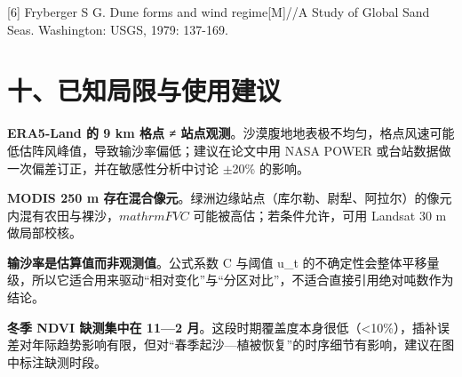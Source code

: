 \documentclass[11pt,a4paper]{ctexart}
\begin{document}
[6] Fryberger S G. Dune forms and wind regime[M]//A Study of Global Sand Seas. Washington: USGS, 1979: 137-169.


\section*{十、已知局限与使用建议}
\textbf{ERA5-Land 的 9 km 格点 ≠ 站点观测}。沙漠腹地地表极不均匀，格点风速可能低估阵风峰值，导致输沙率偏低；建议在论文中用 NASA POWER 或台站数据做一次偏差订正，并在敏感性分析中讨论 $\pm$20\% 的影响。

\textbf{MODIS 250 m 存在混合像元}。绿洲边缘站点（库尔勒、尉犁、阿拉尔）的像元内混有农田与裸沙，$mathrmFVC$ 可能被高估；若条件允许，可用 Landsat 30 m 做局部校核。

\textbf{输沙率是估算值而非观测值}。公式系数 C 与阈值 u\_t 的不确定性会整体平移量级，所以它适合用来驱动“相对变化”与“分区对比”，不适合直接引用绝对吨数作为结论。

\textbf{冬季 NDVI 缺测集中在 11—2 月}。这段时期覆盖度本身很低（<10\%），插补误差对年际趋势影响有限，但对“春季起沙—植被恢复”的时序细节有影响，建议在图中标注缺测时段。
\end{document}
